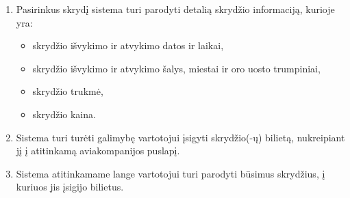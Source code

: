 \documentclass{VUMIFPSkursinis}
\begin{document}
\begin{enumerate}[label=\textbf{FR\arabic*}.]
\begin{enumerate}[label*=\textbf{\arabic*}.]
                    \end{enumerate}
                    \item Pasirinkus skrydį sistema turi parodyti detalią skrydžio informaciją, kurioje yra:
                    \begin{itemize}
                    	\item skrydžio išvykimo ir atvykimo datos ir laikai,
                    	\item skrydžio išvykimo ir atvykimo šalys, miestai ir oro uosto trumpiniai,
						\item skrydžio trukmė,
						\item skrydžio kaina.
                    \end{itemize}
                    \item Sistema turi turėti galimybę vartotojui įsigyti skrydžio(-ų) bilietą, nukreipiant jį į atitinkamą aviakompanijos puslapį.
                    \item Sistema atitinkamame lange vartotojui turi parodyti būsimus skrydžius, į kuriuos jis įsigijo bilietus.
                \end{enumerate}
\end{document}
